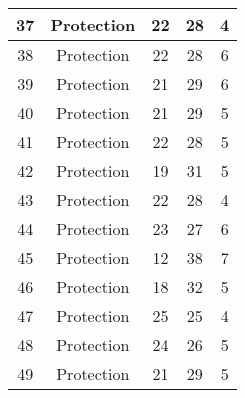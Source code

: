 \documentclass[results.tex]{subfiles}
\begin{document}
\begin{center}
\begin{tabular}{| c || c | c | c | c |}
            \hline
            37                      & Protection                   & 22                     & 28                      & 4                    \\
            \hline
            38                      & Protection                   & 22                     & 28                      & 6                    \\
            \hline
            39                      & Protection                   & 21                     & 29                      & 6                    \\
            \hline
            40                      & Protection                   & 21                     & 29                      & 5                    \\
            \hline
            41                      & Protection                   & 22                     & 28                      & 5                    \\
            \hline
            42                      & Protection                   & 19                     & 31                      & 5                    \\
            \hline
            43                      & Protection                   & 22                     & 28                      & 4                    \\
            \hline
            44                      & Protection                   & 23                     & 27                      & 6                    \\
            \hline
            45                      & Protection                   & 12                     & 38                      & 7                    \\
            \hline
            46                      & Protection                   & 18                     & 32                      & 5                    \\
            \hline
            47                      & Protection                   & 25                     & 25                      & 4                    \\
            \hline
            48                      & Protection                   & 24                     & 26                      & 5                    \\
            \hline
            49                      & Protection                   & 21                     & 29                      & 5                    \\
            \hline
        \end{tabular}
    \end{center}
\end{document}
